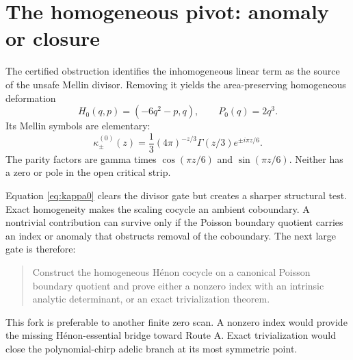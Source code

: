 \section{The homogeneous pivot: anomaly or closure}

The certified obstruction identifies the inhomogeneous linear term as the
source of the unsafe Mellin divisor. Removing it yields the area-preserving
homogeneous deformation
\begin{equation}\label{eq:h0}
H_0(q,p)=(-6q^2-p,q),\qquad P_0(q)=2q^3.
\end{equation}
Its Mellin symbols are elementary:
\begin{equation}\label{eq:kappa0}
\kappa_\pm^{(0)}(z)=\frac13(4\pi)^{-z/3}
\Gamma(z/3)e^{\pm i\pi z/6}.
\end{equation}
The parity factors are gamma times $\cos(\pi z/6)$ and
$\sin(\pi z/6)$. Neither has a zero or pole in the open critical strip.

Equation \eqref{eq:kappa0} clears the divisor gate but creates a sharper
structural test. Exact homogeneity makes the scaling cocycle an ambient
coboundary. A nontrivial contribution can survive only if the Poisson
boundary quotient carries an index or anomaly that obstructs removal of the
coboundary. The next large gate is therefore:
\begin{quote}
Construct the homogeneous H\'enon cocycle on a canonical Poisson boundary
quotient and prove either a nonzero index with an intrinsic analytic
determinant, or an exact trivialization theorem.
\end{quote}

This fork is preferable to another finite zero scan. A nonzero index would
provide the missing H\'enon-essential bridge toward Route A. Exact
trivialization would close the polynomial-chirp adelic branch at its most
symmetric point.
